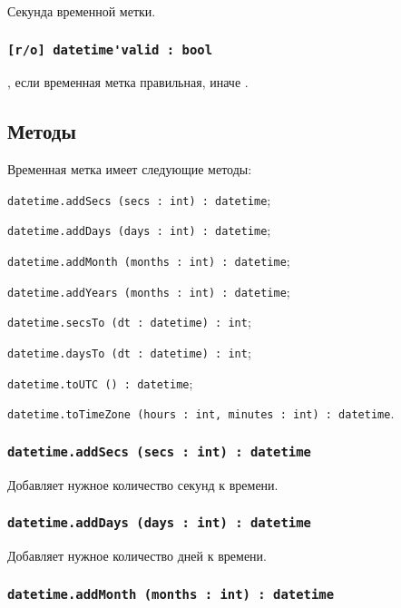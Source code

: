 Секунда временной метки.

\subsubsection{\lstinline|[r/о] datetime'valid : bool|}

\true, если временная метка правильная, иначе \false.

\subsection{Методы}

Временная метка имеет следующие методы:
\begin{icItems}
	\item \lstinline|datetime.addSecs (secs : int) : datetime|;
	\item \lstinline|datetime.addDays (days : int) : datetime|;
	\item \lstinline|datetime.addMonth (months : int) : datetime|;
	\item \lstinline|datetime.addYears (months : int) : datetime|;
	\item \lstinline|datetime.secsTo (dt : datetime) : int|;
	\item \lstinline|datetime.daysTo (dt : datetime) : int|;
	\item \lstinline|datetime.toUTC () : datetime|;
	\item \lstinline|datetime.toTimeZone (hours : int, minutes : int) : datetime|.
\end{icItems}

\subsubsection{\lstinline|datetime.addSecs (secs : int) : datetime|}

Добавляет нужное количество секунд к времени.

\subsubsection{\lstinline|datetime.addDays (days : int) : datetime|}

Добавляет нужное количество дней к времени.

\subsubsection{\lstinline|datetime.addMonth (months : int) : datetime|}

